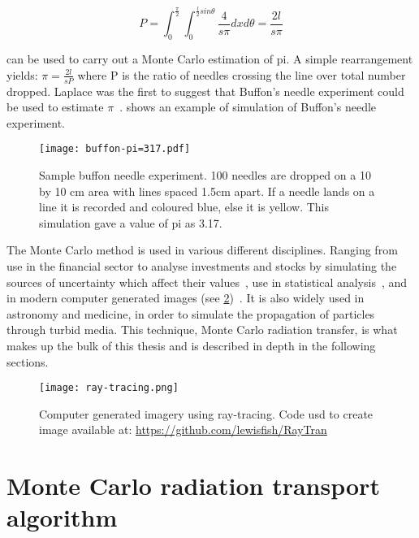 \begin{equation}
P=\int_0^{\frac{\pi}{2}}\int_0^{\frac{l}{2}sin\theta}\frac{4}{s\pi}dx d\theta = \frac{2 l}{s \pi}\label{eqn:buffon}
\end{equation}


 can be used to carry out a Monte Carlo estimation of pi. A simple rearrangement yields: $\pi = \tfrac{2l}{sP}$ where P is the ratio of needles crossing the line over total number dropped. Laplace was the first to suggest that Buffon's needle experiment could be used to estimate $\pi$~\cite{beckmann2015history}.  shows an example of simulation of Buffon's needle experiment.

\begin{figure}[!htb]
\centering
\texttt{[image: buffon-pi=317.pdf]}
\caption{Sample buffon needle experiment. 100 needles are dropped on a 10 by 10 cm area with lines spaced 1.5cm apart. If a needle lands on a line it is recorded and coloured blue, else it is yellow. This simulation gave a value of pi as 3.17.}
\label{fig:buffon-needle}
\end{figure}

The Monte Carlo method is used in various different disciplines. Ranging from use in the financial sector to analyse investments and stocks by simulating the sources of uncertainty which affect their values~\cite{jackel2002monte,finaceprrof}, use in statistical analysis~\cite{wall2012practical}, and in modern computer generated images (see \cref{fig:ray-trace})~\cite{Kajiyarendering,Cookraytracing}. It is also widely used in astronomy and medicine, in order to simulate the propagation of particles through turbid media. This technique, Monte Carlo radiation transfer, is what makes up the bulk of this thesis and is described in depth in the following sections.

\begin{figure}[!htb]
\centering
\texttt{[image: ray-tracing.png]}
\caption{Computer generated imagery using ray-tracing. Code usd to create image available at: \url{https://github.com/lewisfish/RayTran}}
\label{fig:ray-trace}
\end{figure}
\newpage
\section{Monte Carlo radiation transport algorithm}

